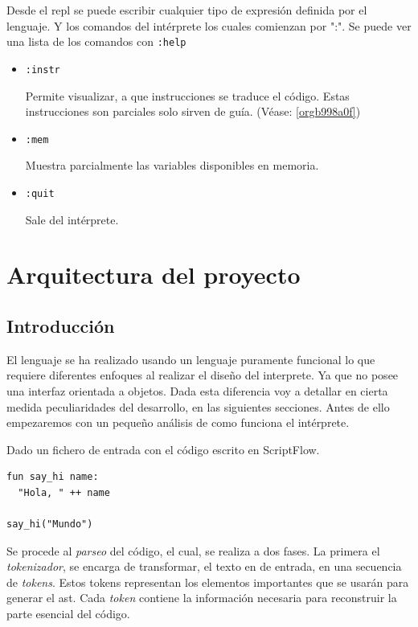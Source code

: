 \documentclass[11pt]{article}
\begin{document}
Desde el \gls{repl} se puede escribir cualquier tipo de expresión definida por el
lenguaje. Y los comandos del intérprete los cuales comienzan por ":". Se
puede ver una lista de los comandos con \texttt{:help}

\begin{itemize}
\item \texttt{:instr}

Permite visualizar, a que instrucciones se traduce el código. Estas
instrucciones son parciales solo sirven de guía. (Véase: \ref{orgb998a0f})

\item \texttt{:mem}

Muestra parcialmente las variables disponibles en memoria.

\item \texttt{:quit}

Sale del intérprete.
\end{itemize}

\section{Arquitectura del proyecto}
\label{sec:orgc61855a}

\subsection{Introducción}
\label{sec:org7f335f2}

El lenguaje se ha realizado usando un lenguaje puramente funcional lo que
requiere diferentes enfoques al realizar el diseño del interprete. Ya que
no posee una interfaz orientada a objetos. Dada esta diferencia voy a
detallar en cierta medida peculiaridades del desarrollo, en las siguientes
secciones. Antes de ello empezaremos con un pequeño análisis de como
funciona el intérprete.

Dado un fichero de entrada con el código escrito en ScriptFlow.

\begin{verbatim}
fun say_hi name:
  "Hola, " ++ name

say_hi("Mundo")
\end{verbatim}


Se procede al \emph{parseo} del código, el cual, se realiza a dos fases. La primera el
\emph{tokenizador}, se encarga de transformar, el texto en de entrada, en una
secuencia de \emph{tokens}. Estos tokens representan los elementos importantes
que se usarán para generar el \gls{ast}. Cada \emph{token} contiene la información
necesaria para reconstruir la parte esencial del código.
\end{document}
